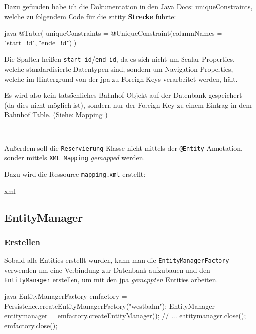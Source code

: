 Dazu gefunden habe ich die Dokumentation in den Java Docs: \gls{uniqueConstraints}, welche zu folgendem Code für die \gls{entity} \textbf{Strecke} führte:

\begin{code}{java}
@Table(
        uniqueConstraints = @UniqueConstraint(columnNames = {"start_id", "ende_id"})
)
\end{code}

Die Spalten heißen \texttt{start\_id}/\texttt{end\_id}, da es sich nicht um Scalar-Properties, welche standardisierte Datentypen sind, sondern um Navigation-Properties, welche im Hintergrund von der \gls{jpa} zu Foreign Keys verarbeitet werden, hält.

Es wird also kein tatsächliches Bahnhof Objekt auf der Datenbank gespeichert (da dies nicht möglich ist), sondern nur der Foreign Key zu einem Eintrag in dem Bahnhof Table. (Siehe: Mapping \cite{wiki:mapping})

\

Außerdem soll die \texttt{Reservierung} Klasse nicht mittels der \texttt{@Entity} Annotation, sonder mittels \texttt{XML Mapping} \textit{gemapped} werden.

Dazu wird die Ressource \texttt{mapping.xml} erstellt:

\begin{code}{xml}

\end{code}

\clearpage
\subsection{EntityManager}

\subsubsection{Erstellen}

Sobald alle Entities erstellt wurden, kann man die \texttt{EntityManagerFactory} \cite{jdoc:entityManagerFactory} verwenden um eine Verbindung zur Datenbank aufzubauen und den \texttt{EntityManager} \cite{jdoc:entityManager} erstellen, um mit den \gls{jpa} \textit{gemappten} Entities arbeiten.

\begin{code}{java}
EntityManagerFactory emfactory = Persistence.createEntityManagerFactory("westbahn");
EntityManager entitymanager = emfactory.createEntityManager();
// ...
entitymanager.close();
emfactory.close();
\end{code}


